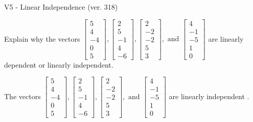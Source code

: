 \begin{exercise}
  \begin{exerciseTitle}V5 - Linear Independence (ver. 318)\end{exerciseTitle}
  \begin{exerciseStatement}
    Explain why the vectors \(\left[\begin{array}{r}
5 \\
4 \\
-4 \\
0 \\
5
\end{array}\right] , \left[\begin{array}{r}
2 \\
5 \\
-1 \\
4 \\
-6
\end{array}\right] , \left[\begin{array}{r}
2 \\
-2 \\
-2 \\
5 \\
3
\end{array}\right] , \text{ and } \left[\begin{array}{r}
4 \\
-1 \\
-5 \\
1 \\
0
\end{array}\right]\) are linearly dependent or linearly independent.	


  \end{exerciseStatement}
  \begin{exerciseAnswer}
   The vectors \(\left[\begin{array}{r}
5 \\
4 \\
-4 \\
0 \\
5
\end{array}\right] , \left[\begin{array}{r}
2 \\
5 \\
-1 \\
4 \\
-6
\end{array}\right] , \left[\begin{array}{r}
2 \\
-2 \\
-2 \\
5 \\
3
\end{array}\right] , \text{ and } \left[\begin{array}{r}
4 \\
-1 \\
-5 \\
1 \\
0
\end{array}\right]\) are 
  	 linearly independent  .
  


  \end{exerciseAnswer}
\end{exercise}